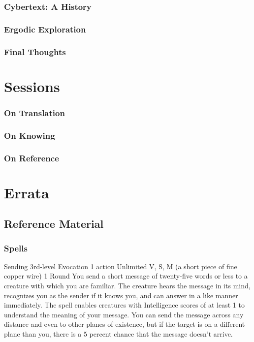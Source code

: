 \documentclass[10pt,twoside,twocolumn,openany]{book}
\begin{document}
\section{Cybertext: A History}
    \lipsum[3]
\section{Ergodic Exploration}
    \lipsum[4]
\section{Final Thoughts}
    \lipsum[5]



\part{Sessions}
\section{On Translation}
    \lipsum[1]
\section{On Knowing}
    \lipsum[2]
\section{On Reference}
    \lipsum[3]
    
\part{Errata}
\chapter{Reference Material}

\section{Spells}
    \DndSpellHeader%
      {Sending}
      {3rd-level Evocation}
      {1 action}
      {Unlimited}
      {V, S, M (a short piece of fine copper wire)}
      {1 Round}
            You send a short message of twenty-five words or less to a creature with which you are familiar. The creature hears the message in its mind, recognizes you as the sender if it knows you, and can answer in a like manner immediately. The spell enables creatures with Intelligence scores of at least 1 to understand the meaning of your message.
            You can send the message across any distance and even to other planes of existence, but if the target is on a different plane than you, there is a 5 percent chance that the message doesn't arrive.
            
\end{document}

